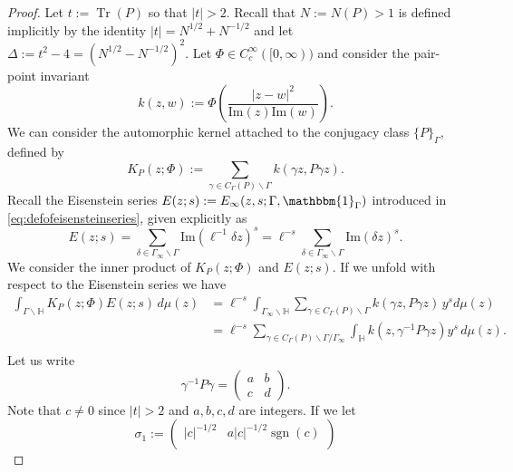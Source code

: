 \documentclass{article}
\theoremstyle{named}
\newcommand{\Hyp}{\mathbb{H}}
\DeclareMathOperator{\sgn}{sgn}
\DeclareMathOperator{\Tr}{Tr}
\begin{document}
\begin{proof}
Let $t := \Tr(P)$ so that $|t| > 2$. Recall that $N := N(P) > 1$ is defined implicitly by the identity $|t| = N^{1/2} + N^{-1/2}$ and let $\Delta := t^2 - 4 = (N^{1/2} - N^{-1/2})^2$. Let $\Phi \in C_c^\infty([0, \infty))$ and consider the pair-point invariant 
\begin{equation*}
    k(z, w):= \Phi\left(\frac{|z-w|^2}{\text{Im}(z)\text{Im}(w)}\right).
\end{equation*}
We can consider the automorphic kernel attached to the conjugacy class $\{P\}_\Gamma$, defined by
\begin{equation*}
    K_P(z; \Phi) :=  \sum_{\gamma \in C_\Gamma(P)\backslash \Gamma} k(\gamma z, P\gamma z).
\end{equation*}
Recall the Eisenstein series $E(z; s) := E_\infty(z, s; \Gamma, \mathbbm{1}_\Gamma)$ introduced in \eqref{eq:defofeisensteinseries}, given explicitly as 
\begin{equation*}
    E(z; s) = \sum_{\delta \in \Gamma_\infty \backslash \Gamma} \text{Im}(\ell^{-1} \delta z)^s = \ell^{-s} \sum_{\delta \in \Gamma_\infty \backslash \Gamma} \text{Im}(\delta z)^s.
\end{equation*}
We consider the inner product of $K_P(z; \Phi)$ and $E(z;s)$. If we unfold with respect to the Eisenstein series we have
\begin{equation}\label{auxeq:unfoldingeisensteinautomorphic}
\begin{aligned}
\int_{\Gamma\backslash \Hyp} K_P(z; \Phi)E(z; s)\, d\mu(z) & = \ell^{-s}\int_{\Gamma_\infty\backslash \Hyp} \sum_{\gamma \in C_\Gamma(P)\backslash \Gamma} k(\gamma z, P\gamma z) \, y^s d\mu(z)\\
 & = \ell^{-s}\sum_{\gamma \in C_\Gamma(P)\backslash \Gamma/\Gamma_\infty} \int_\Hyp k(z, \gamma^{-1}P\gamma z) y^s \, d\mu(z).\\
\end{aligned}
\end{equation}
Let us write
\begin{equation*}
    \gamma^{-1}P\gamma = \begin{pmatrix}
        a & b\\
        c & d
    \end{pmatrix}.
\end{equation*}
Note that $c \neq 0$ since $|t| > 2$ and $a, b, c, d$ are integers. If we let 
\begin{equation*}
    \sigma_1 := \begin{pmatrix}
|c|^{-1/2} & a|c|^{-1/2}\sgn(c)\\

\end{pmatrix}
\end{equation*}
\end{proof}
\end{document}
